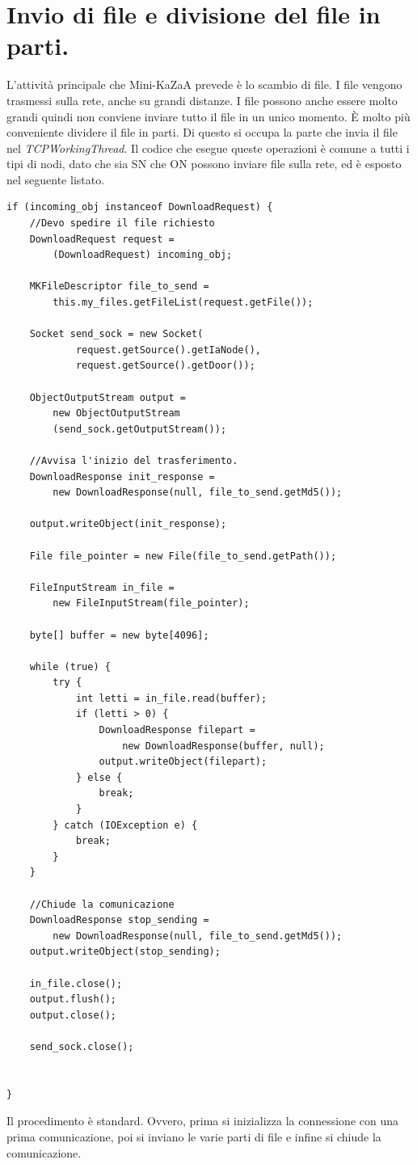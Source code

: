 \section{Invio di file e divisione del file in parti.}\label{sec:download_tcp}\label{sec:scambio}
L'attività principale che Mini-KaZaA prevede è lo scambio di file. I file vengono trasmessi sulla rete, anche su grandi distanze.
I file possono anche essere molto grandi quindi non conviene inviare tutto il file in un unico momento. \`{E} molto più conveniente dividere il file in parti.
Di questo si occupa la parte che invia il file nel \emph{TCPWorkingThread}.
Il codice che esegue queste operazioni è comune a tutti i tipi di nodi, dato che sia SN che ON possono inviare file sulla rete, ed è esposto nel seguente listato.
\begin{lstlisting}
if (incoming_obj instanceof DownloadRequest) {
	//Devo spedire il file richiesto
	DownloadRequest request = 
		(DownloadRequest) incoming_obj;

	MKFileDescriptor file_to_send = 
		this.my_files.getFileList(request.getFile());

	Socket send_sock = new Socket(
			request.getSource().getIaNode(),
			request.getSource().getDoor());

	ObjectOutputStream output = 
		new ObjectOutputStream
		(send_sock.getOutputStream());

	//Avvisa l'inizio del trasferimento.
	DownloadResponse init_response = 
		new DownloadResponse(null, file_to_send.getMd5());

	output.writeObject(init_response);

	File file_pointer = new File(file_to_send.getPath());

	FileInputStream in_file = 
		new FileInputStream(file_pointer);

	byte[] buffer = new byte[4096];

	while (true) {
		try {
			int letti = in_file.read(buffer);
			if (letti > 0) {
				DownloadResponse filepart = 
					new DownloadResponse(buffer, null);
				output.writeObject(filepart);
			} else {
				break;
			}
		} catch (IOException e) {
			break;
		}
	}

	//Chiude la comunicazione
	DownloadResponse stop_sending = 
		new DownloadResponse(null, file_to_send.getMd5());
	output.writeObject(stop_sending);

	in_file.close();
	output.flush();
	output.close();

	send_sock.close();

	
}
\end{lstlisting}
Il procedimento è standard. Ovvero, prima si inizializza la connessione con una prima comunicazione, poi si inviano le varie parti di file e infine si chiude la comunicazione.

